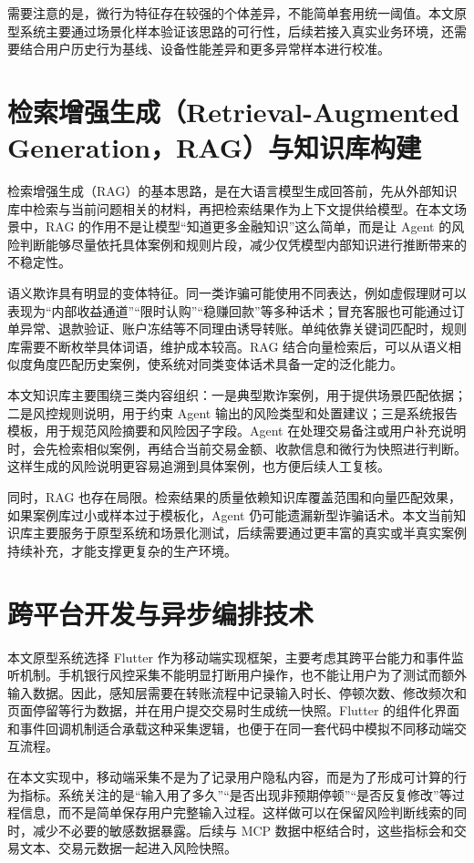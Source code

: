\documentclass{xduugthesis}
\begin{document}
需要注意的是，微行为特征存在较强的个体差异，不能简单套用统一阈值。本文原型系统主要通过场景化样本验证该思路的可行性，后续若接入真实业务环境，还需要结合用户历史行为基线、设备性能差异和更多异常样本进行校准。

\section{检索增强生成（Retrieval-Augmented Generation，RAG）与知识库构建}
检索增强生成（RAG）的基本思路，是在大语言模型生成回答前，先从外部知识库中检索与当前问题相关的材料，再把检索结果作为上下文提供给模型\cite{lewis2020rag,srinivasan2025rag}。在本文场景中，RAG 的作用不是让模型“知道更多金融知识”这么简单，而是让 Agent 的风险判断能够尽量依托具体案例和规则片段，减少仅凭模型内部知识进行推断带来的不稳定性。

语义欺诈具有明显的变体特征。同一类诈骗可能使用不同表达，例如虚假理财可以表现为“内部收益通道”“限时认购”“稳赚回款”等多种话术；冒充客服也可能通过订单异常、退款验证、账户冻结等不同理由诱导转账。单纯依靠关键词匹配时，规则库需要不断枚举具体词语，维护成本较高。RAG 结合向量检索后，可以从语义相似度角度匹配历史案例，使系统对同类变体话术具备一定的泛化能力。

本文知识库主要围绕三类内容组织：一是典型欺诈案例，用于提供场景匹配依据；二是风控规则说明，用于约束 Agent 输出的风险类型和处置建议；三是系统报告模板，用于规范风险摘要和风险因子字段。Agent 在处理交易备注或用户补充说明时，会先检索相似案例，再结合当前交易金额、收款信息和微行为快照进行判断。这样生成的风险说明更容易追溯到具体案例，也方便后续人工复核。

同时，RAG 也存在局限。检索结果的质量依赖知识库覆盖范围和向量匹配效果，如果案例库过小或样本过于模板化，Agent 仍可能遗漏新型诈骗话术。本文当前知识库主要服务于原型系统和场景化测试，后续需要通过更丰富的真实或半真实案例持续补充，才能支撑更复杂的生产环境。

\section{跨平台开发与异步编排技术}
本文原型系统选择 Flutter 作为移动端实现框架，主要考虑其跨平台能力和事件监听机制。手机银行风控采集不能明显打断用户操作，也不能让用户为了测试而额外输入数据。因此，感知层需要在转账流程中记录输入时长、停顿次数、修改频次和页面停留等行为数据，并在用户提交交易时生成统一快照。Flutter 的组件化界面和事件回调机制适合承载这种采集逻辑，也便于在同一套代码中模拟不同移动端交互流程。

在本文实现中，移动端采集不是为了记录用户隐私内容，而是为了形成可计算的行为指标。系统关注的是“输入用了多久”“是否出现非预期停顿”“是否反复修改”等过程信息，而不是简单保存用户完整输入过程。这样做可以在保留风险判断线索的同时，减少不必要的敏感数据暴露。后续与 MCP 数据中枢结合时，这些指标会和交易文本、交易元数据一起进入风险快照。
\end{document}
